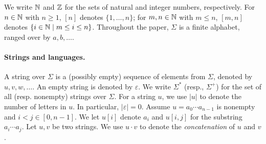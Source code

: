 %

We write $\mathbb{N}$ and $\mathbb{Z}$ for the sets of natural and integer numbers, respectively. For $n \in \mathbb{N}$ with $n \ge 1$, $[n]$ denotes $\{1, \ldots, n\}$; for $m,n \in \mathbb{N}$ with $m \le n$,  $[m, n]$ denotes $\{ i \in \mathbb{N} \mid m \le i \le n \}$. Throughout the paper, $\Sigma$ is a finite alphabet, ranged over by $a,b,\ldots$.  

\paragraph*{Strings and languages.}
A string over $\Sigma$ is a (possibly empty) sequence of elements from $\Sigma$,
denoted by $u, v, w, \ldots$. An empty string is denoted by $\varepsilon$.  We write $\Sigma^*$ (resp., $\Sigma^+$) for the set of all (resp. nonempty) strings over $\Sigma$.
For a string $u$, we use $|u|$ to denote the number of letters in $u$. In particular, $|\varepsilon|=0$. 
Assume $u=a_0\cdots a_{n-1}$ is nonempty and $i<j \in [0,n-1]$. %
We let $u[i]$ denote $a_i$ and $u[i,j]$ for the substring %
$a_i\cdots a_j$. 
%
Let $u, v$ be two strings. We use $u \cdot v$ to denote the \emph{concatenation} of $u$ and $v$.

